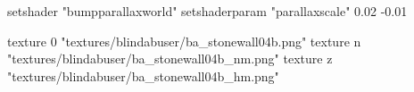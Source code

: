 	setshader "bumpparallaxworld"
	setshaderparam "parallaxscale" 0.02 -0.01

		texture 0 "textures/blindabuser/ba_stonewall04b.png"
		texture n "textures/blindabuser/ba_stonewall04b_nm.png"
		texture z "textures/blindabuser/ba_stonewall04b_hm.png"

